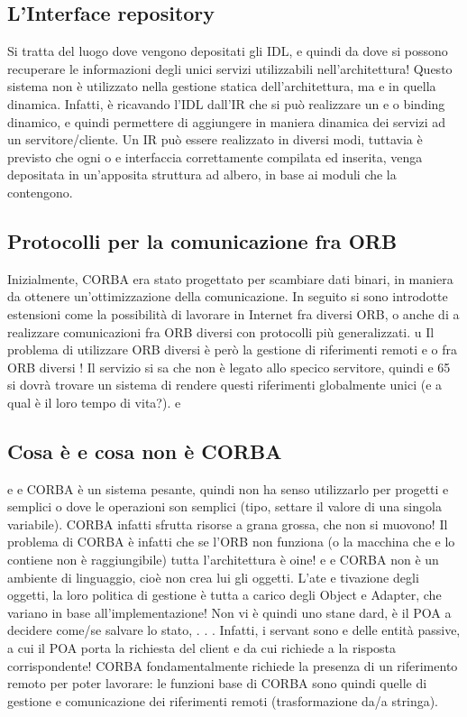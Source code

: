 \subsection{L'Interface repository}
Si tratta del luogo dove vengono depositati gli IDL, e quindi da dove si possono
recuperare le informazioni degli unici servizi utilizzabili nell'architettura!
Questo sistema non è utilizzato nella gestione statica dell'architettura, ma
e
in quella dinamica. Infatti, è ricavando l'IDL dall'IR che si può realizzare un
e
o
binding dinamico, e quindi permettere di aggiungere in maniera dinamica dei
servizi ad un servitore/cliente.
Un IR può essere realizzato in diversi modi, tuttavia è previsto che ogni
o
e
interfaccia correttamente compilata ed inserita, venga depositata in un'apposita
struttura ad albero, in base ai moduli che la contengono.
\subsection{Protocolli per la comunicazione fra ORB}
Inizialmente, CORBA era stato progettato per scambiare dati binari, in maniera
da ottenere un'ottimizzazione della comunicazione. In seguito si sono introdotte
estensioni come la possibilità di lavorare in Internet fra diversi ORB, o anche di
a
realizzare comunicazioni fra ORB diversi con protocolli più generalizzati.
u
Il problema di utilizzare ORB diversi è però la gestione di riferimenti remoti
e
o
fra ORB diversi ! Il servizio si sa che non è legato allo specico servitore, quindi
e
65
si dovrà trovare un sistema di rendere questi riferimenti globalmente unici (e
a
qual è il loro tempo di vita?).
e
\subsection{Cosa è e cosa non è CORBA}
e
e
CORBA è un sistema pesante, quindi non ha senso utilizzarlo per progetti
e
semplici o dove le operazioni son semplici (tipo, settare il valore di una singola
variabile). CORBA infatti sfrutta risorse a grana grossa, che non si muovono!
Il problema di CORBA è infatti che se l'ORB non funziona (o la macchina che
e
lo contiene non è raggiungibile) tutta l'architettura è oine!
e
e
CORBA non è un ambiente di linguaggio, cioè non crea lui gli oggetti. L'ate
e
tivazione degli oggetti, la loro politica di gestione è tutta a carico degli Object
e
Adapter, che variano in base all'implementazione! Non vi è quindi uno stane
dard, è il POA a decidere come/se salvare lo stato, . . . Infatti, i servant sono
e
delle entità passive, a cui il POA porta la richiesta del client e da cui richiede
a
la risposta corrispondente!
CORBA fondamentalmente richiede la presenza di un riferimento remoto
per poter lavorare: le funzioni base di CORBA sono quindi quelle di gestione e
comunicazione dei riferimenti remoti (trasformazione da/a stringa).
